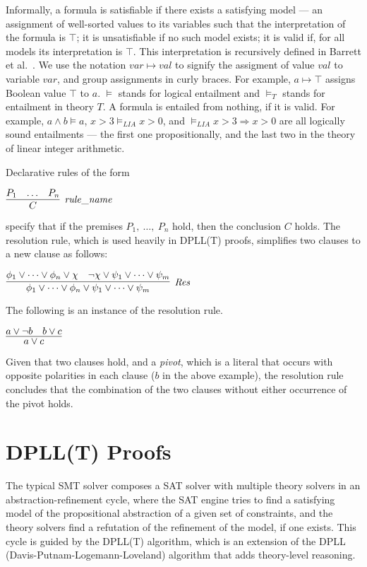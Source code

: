 \documentclass[11pt]{article}
\begin{document}
	Informally, a formula is satisfiable
	if there exists a satisfying model 
	--- an assignment of well-sorted 
	values to its variables such that 
	the interpretation of the formula 
	is $\top$; it is unsatisfiable if 
	no such model exists; it is valid
	if, for all models its interpretation
	is $\top$. This interpretation 
	is recursively defined in 
	Barrett et al.~\cite{Barrett2018}.
	We use the notation
	$var \mapsto val$ to signify the 
	assigment of value $val$ to 
	variable $var$, and group 
	assignments in curly braces. 
	For example, 
	$a \mapsto \top$ assigns Boolean value 
	$\top$ to $a$. $\models$ stands for 
	logical entailment and $\models_T$ 
	stands for entailment in theory $T$. 
	A formula is entailed from nothing, 
	if it is valid. For example, 
	$a \land b \models a$,
	$x > 3 \models_{LIA} x > 0$, and 
	$\models_{LIA} x > 3 \Rightarrow 
	x > 0$ are all logically sound 
	entailments --- the first one 
	propositionally, and the
	last two in the theory of linear 
	integer arithmetic.
	
	Declarative rules of the form
	\begin{center}
		$\infer[\mathit{rule\_name}]{C}{P_1 & \ldots & P_n}$
	\end{center}
	specify that if the premises 
	$P_1,\ \ldots,\ P_n$ hold, then the 
	conclusion $C$
	holds. The resolution rule,
	which is used heavily in DPLL(T) proofs,
	simplifies two 
	clauses to a new clause as follows:
	\begin{center}
		$\infer[\mathit{Res}]{\phi_1 \lor \cdots \lor 
			\phi_n \lor \psi_1 \lor \cdots \lor 
			\psi_m}{\phi_1 \lor \cdots \lor \phi_n 
			\lor \chi & \neg \chi \lor \psi_1 
			\lor \cdots \lor \psi_m}$ 
	\end{center}
	The following is an instance of the 
	resolution rule.
	\begin{center}
		$\infer{a \lor c}{a \lor \neg b 
			& b \lor c}$
	\end{center}
	Given that two clauses hold, 
	and a \textit{pivot}, which is a 
	literal that occurs with opposite 
	polarities in each clause ($b$ in 
	the above example), the resolution 
	rule concludes that 
	the combination of the two clauses 
	without either occurrence of the 
	pivot holds.
	

\section{DPLL(T) Proofs}
\label{sec:smtproofs}
	The typical SMT solver composes 
	a SAT solver with multiple theory
	solvers in an abstraction-refinement
	cycle, where the SAT engine 
	tries to find a satisfying 
	model of the propositional
	abstraction of a given set of 
	constraints, and the theory
	solvers find a refutation of 
	the refinement of the model, if 
	one exists.
	This cycle is guided by the 
	DPLL(T) algorithm, which is an
	extension of the 
	DPLL~\cite{Loveland2016}
	(Davis-Putnam-Logemann-Loveland) 
	algorithm that adds theory-level 
	reasoning.
	
\end{document}
